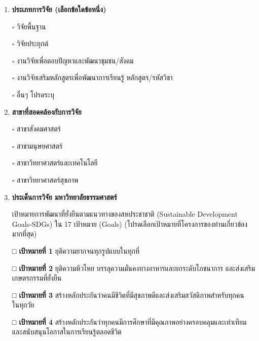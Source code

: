 \documentclass[16pt]{extarticle}
\begin{document}
\begin{enumerate}[label=\arabic*., leftmargin=0pt, itemindent=2.5em, labelsep=0.5em]
\noindent\hspace{1em} ตำแหน่งทางวิชาการ ชื่อ-นามสกุล

\noindent\hspace{1em} สังกัด

\item \textbf{ประเภทการวิจัย (เลือกข้อใดข้อหนึ่ง)}

\noindent\hspace{1em} $\square$ วิจัยพื้นฐาน

\noindent\hspace{1em} $\square$ วิจัยประยุกต์

\noindent\hspace{1em} $\square$ งานวิจัยเพื่อตอบปัญหาและพัฒนาชุมชน/สังคม

\noindent\hspace{1em} $\square$ งานวิจัยเสริมหลักสูตรเพื่อพัฒนาการเรียนรู้ หลักสูตร/รหัสวิชา

\noindent\hspace{1em} $\square$ อื่นๆ โปรดระบุ

\item \textbf{สาขาที่สอดคล้องกับการวิจัย}

\noindent\hspace{1em} $\square$ สาขาสังคมศาสตร์

\noindent\hspace{1em} $\square$ สาขามนุษยศาสตร์

\noindent\hspace{1em} $\square$ สาขาวิทยาศาสตร์และเทคโนโลยี

\noindent\hspace{1em} $\square$ สาขาวิทยาศาสตร์สุขภาพ

\item \textbf{ประเด็นการวิจัย มหาวิทยาลัยธรรมศาสตร์}

เป้าหมายการพัฒนาที่ยั่งยืนตามแนวทางของสหประชาชาติ (Sustainable
Development Goals-SDGs) ใน 17 เป้าหมาย (Goals)
(โปรดเลือกเป้าหมายที่โครงการของท่านเกี่ยวข้องมากที่สุด)

\textbf{□ เป้าหมายที่ 1} ยุติความยากจนทุกรูปแบบในทุกที่

\textbf{□ เป้าหมายที่ 2} ยุติความหิวโหย บรรลุความมั่นคงทางอาหารและยกระดับโภชนาการ
และส่งเสริมเกษตรกรรมที่ยั่งยืน

\textbf{□ เป้าหมายที่ 3}
สร้างหลักประกันว่าคนมีชีวิตที่มีสุขภาพดีและส่งเสริมสวัสดิภาพสำหรับทุกคน\\
ในทุกวัย

\textbf{□ เป้าหมายที่ 4}
สร้างหลักประกันว่าทุกคนมีการศึกษาที่มีคุณภาพอย่างครอบคลุมและเท่าเทียม
และสนับสนุนโอกาสในการเรียนรู้ตลอดชีวิต


\end{enumerate}
\end{document}
